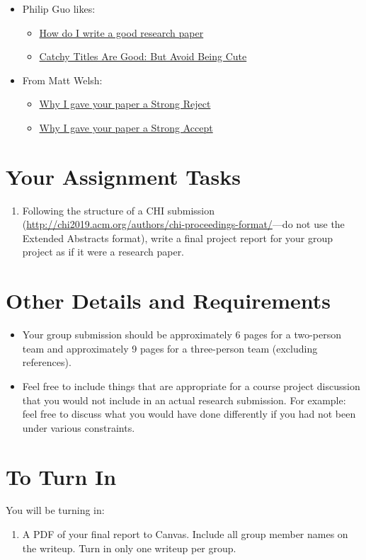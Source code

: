 \documentclass{article}
\begin{document}
\begin{itemize}
\item Philip Guo likes:
    \begin{itemize}
        \item \href{https://faculty.washington.edu/ajko/advice#goodpaper}{How do I write a good research paper}
        \item \href{http://faculty.washington.edu/wobbrock/pubs/Wobbrock-2015.pdf}{Catchy Titles Are Good: But Avoid Being Cute}
    \end{itemize}
\item From Matt Welsh:
\begin{itemize}
    \item \href{http://matt-welsh.blogspot.com/2016/04/why-i-gave-your-paper-strong-reject.html}{Why I gave your paper a Strong Reject}
    \item \href{http://matt-welsh.blogspot.com/2016/04/why-i-gave-your-paper-strong-accept.html}{Why I gave your paper a Strong Accept}
\end{itemize}
\end{itemize}

\section{Your Assignment Tasks}
\begin{enumerate}
    \item Following the structure of a CHI submission (\href{http://chi2019.acm.org/authors/chi-proceedings-format/}{http://chi2019.acm.org/authors/chi-proceedings-format/}---do not use the Extended Abstracts format), write a final project report for your group project as if it were a research paper.
    
\end{enumerate}

\section{Other Details and Requirements}

\begin{itemize}
    \item Your group submission should be approximately 6 pages for a two-person team and approximately 9 pages for a three-person team (excluding references).
    \item Feel free to include things that are appropriate for a course project discussion that you would not include in an actual research submission. For example: feel free to discuss what you would have done differently if you had not been under various constraints.
\end{itemize}

\section{To Turn In}
You will be turning in:
\begin{enumerate}
    \item A PDF of your final report to Canvas. Include all group member names on the writeup. Turn in only one writeup per group.  
\end{enumerate}
\end{document}
